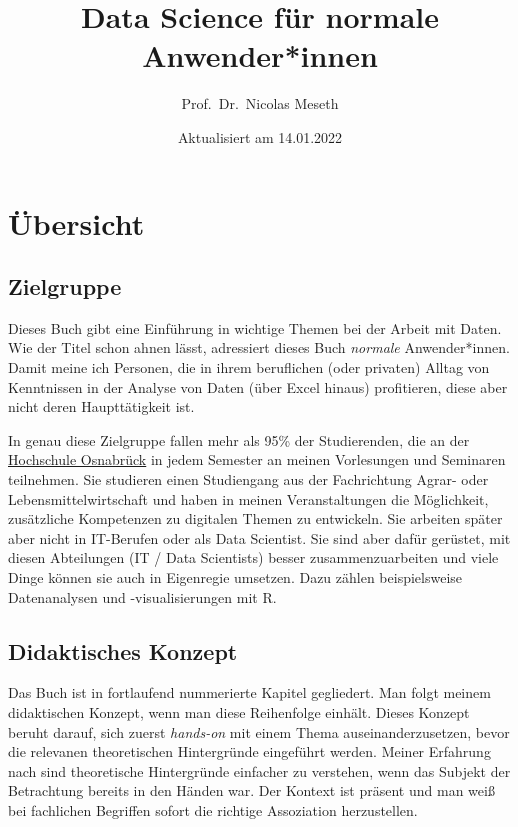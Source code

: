 \documentclass[
]{book}
\title{Data Science für normale Anwender*innen}
\author{Prof.~Dr.~Nicolas Meseth}
\date{Aktualisiert am 14.01.2022}
\begin{document}
\maketitle

{
\setcounter{tocdepth}{1}
\tableofcontents
}
\hypertarget{uxfcbersicht}{%
\chapter*{Übersicht}\label{uxfcbersicht}}

\hypertarget{zielgruppe}{%
\section*{Zielgruppe}\label{zielgruppe}}

Dieses Buch gibt eine Einführung in wichtige Themen bei der Arbeit mit Daten. Wie der Titel schon ahnen lässt, adressiert dieses Buch \emph{normale} Anwender*innen. Damit meine ich Personen, die in ihrem beruflichen (oder privaten) Alltag von Kenntnissen in der Analyse von Daten (über Excel hinaus) profitieren, diese aber nicht deren Haupttätigkeit ist.

In genau diese Zielgruppe fallen mehr als 95\% der Studierenden, die an der \href{https://hs-osnabrueck.de}{Hochschule Osnabrück} in jedem Semester an meinen Vorlesungen und Seminaren teilnehmen. Sie studieren einen Studiengang aus der Fachrichtung Agrar- oder Lebensmittelwirtschaft und haben in meinen Veranstaltungen die Möglichkeit, zusätzliche Kompetenzen zu digitalen Themen zu entwickeln. Sie arbeiten später aber nicht in IT-Berufen oder als Data Scientist. Sie sind aber dafür gerüstet, mit diesen Abteilungen (IT / Data Scientists) besser zusammenzuarbeiten und viele Dinge können sie auch in Eigenregie umsetzen. Dazu zählen beispielsweise Datenanalysen und -visualisierungen mit R.

\hypertarget{didaktisches-konzept}{%
\section*{Didaktisches Konzept}\label{didaktisches-konzept}}

Das Buch ist in fortlaufend nummerierte Kapitel gegliedert. Man folgt meinem didaktischen Konzept, wenn man diese Reihenfolge einhält. Dieses Konzept beruht darauf, sich zuerst \emph{hands-on} mit einem Thema auseinanderzusetzen, bevor die relevanen theoretischen Hintergründe eingeführt werden. Meiner Erfahrung nach sind theoretische Hintergründe einfacher zu verstehen, wenn das Subjekt der Betrachtung bereits in den Händen war. Der Kontext ist präsent und man weiß bei fachlichen Begriffen sofort die richtige Assoziation herzustellen.
\end{document}
